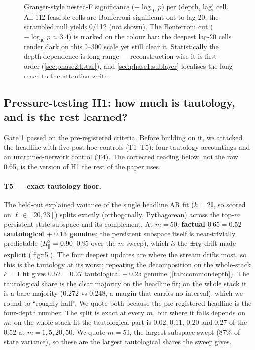 \begin{figure}[t]
  \centering
  
  \caption{Granger-style nested-F significance ($-\log_{10} p$) per (depth,
  lag) cell. All 112 feasible cells are Bonferroni-significant out to lag 20;
  the scrambled null yields 0/112 (not shown). The Bonferroni cut
  ($-\log_{10} p \approx 3.4$) is marked on the colour bar: the deepest
  lag-20 cells render dark on this 0--300 scale yet still clear it.
  Statistically the depth
  dependence is long-range --- reconstruction-wise it is first-order
  (\cref{sec:phase2:kstar}), and \cref{sec:phase1:sublayer} localises the
  long reach to the attention write.}
  \label{fig:h1-granger}
\end{figure}

\subsection{Pressure-testing H1: how much is tautology, and is the rest
learned?}
\label{sec:phase1:pressure}

Gate 1 passed on the pre-registered criteria. Before building on it, we
attacked the headline with five post-hoc controls (T1--T5): four tautology
accountings and an untrained-network control (T4). The corrected reading
below, not the raw 0.65, is the version of H1 the rest of the paper uses.

\paragraph{T5 --- exact tautology floor.}
The held-out explained variance of the single headline AR fit ($k{=}20$, so
scored on $\ell \in [20,23]$) splits exactly
(orthogonally, Pythagorean) across the top-$m$ persistent state subspace and
its complement. At $m=50$: \textbf{factual $0.65 = 0.52$ tautological
$+\;0.13$ genuine}; the persistent subspace itself is near-trivially
predictable ($R^2_{\parallel} = 0.90$--$0.95$ over the $m$ sweep), which
\emph{is} the $\pm v_\ell$ drift made explicit (\cref{fig:t5}). The four deepest
updates are where the stream drifts most, so this is the tautology at its
worst; repeating the decomposition on the whole-stack $k{=}1$ fit gives
$0.52 = 0.27$ tautological $+\;0.25$ genuine (\cref{tab:commondepth}). The
tautological share is the clear majority on the headline fit; on the whole
stack it is a bare majority ($0.272$ vs $0.248$, a margin that carries no
interval), which we round to ``roughly half''. We quote both because the
pre-registered headline is the four-depth number. The split is exact at every
$m$, but where it falls depends on $m$: on the whole-stack fit the
tautological part is $0.02$, $0.11$, $0.20$ and $0.27$ of the $0.52$ at
$m = 1, 5, 20, 50$. We quote $m{=}50$, the largest subspace swept (87\% of
state variance), so these are the largest tautological shares the sweep
gives.

